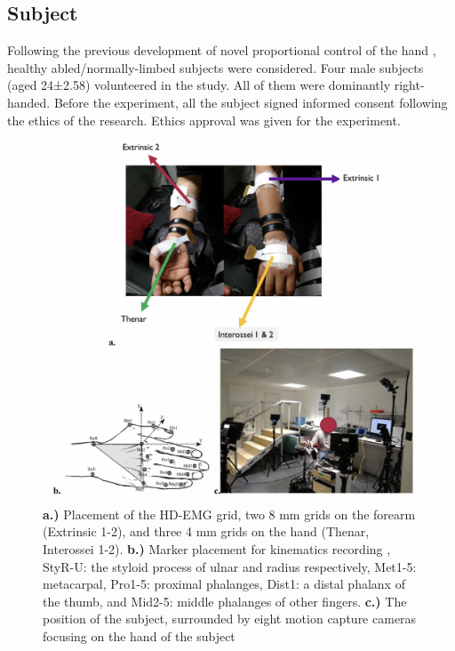 \documentclass[conference]{IEEEtran}
\begin{document}
\subsection{Subject}
Following the previous development of novel proportional control of the hand \cite{b9}\cite{b16}, healthy 
abled/normally-limbed subjects were considered. Four male subjects (aged 24±2.58) volunteered in the 
study. All of them were dominantly right-handed. Before the experiment, all the subject signed informed 
consent following the ethics of the research. Ethics approval was given for the experiment.
\begin{figure}[htbp]
\centerline{\includegraphics[width=\columnwidth]{figure1.png}}
\caption{\textbf{a.)} Placement of the HD-EMG grid, two 8 mm grids on the forearm (Extrinsic 1-2), and three 4 mm grids on the hand (Thenar, Interossei 1-2). \textbf{b.)} Marker placement for kinematics recording \cite{b25}, StyR-U: the styloid process of ulnar and radius respectively, Met1-5: metacarpal, Pro1-5: proximal phalanges, Dist1: a distal phalanx of the thumb, and Mid2-5: middle phalanges of other fingers. \textbf{c.)} The position of the subject, surrounded by eight motion capture cameras focusing on the hand of the subject}
\label{figure1}
\end{figure}
\end{document}
